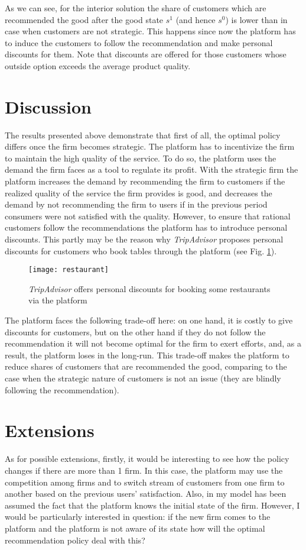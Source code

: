 \documentclass[a4paper]{article}
\begin{document}
	 As we can see, for the interior solution the share of customers which are recommended the good after the good state $s^1$ (and hence $s^0$) is lower than in case when customers are not strategic. This happens since now the platform has to induce the customers to follow the recommendation and make personal discounts for them. Note that discounts are offered for those customers whose outside option exceeds the average product quality.
\section{Discussion}
The results presented above demonstrate that first of all, the optimal policy differs once the firm becomes strategic. The platform has to incentivize the firm to maintain the high quality of the service. To do so, the platform uses the demand the firm faces as a tool to regulate its profit. With the strategic firm the platform increases the demand by recommending the firm to customers if the realized quality of the service the firm provides is good, and decreases the demand by not recommending the firm to users if in the previous period consumers were not satisfied with the quality. However, to ensure that rational customers follow the recommendations the platform has to introduce personal discounts. This partly may be the reason why \textit{TripAdvisor} proposes personal discounts for customers who book tables through the platform (see Fig. \ref{fig2}).
\begin{figure}
	\centering
	\texttt{[image: restaurant]}
	\caption{\textit{TripAdvisor} offers personal discounts for booking some restaurants via the platform}\label{fig2}
\end{figure}
The platform faces the following trade-off here: on one hand, it is costly to give discounts for customers, but on the other hand if they do not follow the recommendation it will not become optimal for the firm to exert efforts, and, as a result, the platform loses in the long-run. This trade-off makes the platform to reduce shares of customers that are recommended the good, comparing to the case when the strategic nature of customers is not an issue (they are blindly following the recommendation).


\section{Extensions}
As for possible extensions, firstly, it would be interesting to see how the policy changes if there are more than 1 firm. In this case, the platform may use the competition among firms and to switch stream of customers from one firm to another based on the previous users' satisfaction. Also, in my model has been assumed the fact that the platform knows the initial state of the firm. However, I would be particularly interested in question: if the new firm comes to the platform and the platform is not aware of its state how will the optimal recommendation policy deal with this?
\end{document}
